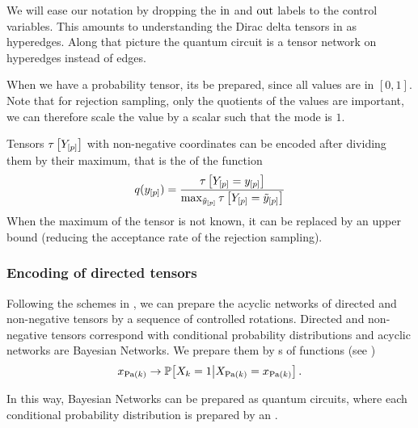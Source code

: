 We will ease our notation by dropping the $\mathrm{in}$ and $\mathrm{out}$ labels to the control variables.
This amounts to understanding the Dirac delta tensors in \activationCircuits{} as hyperedges.
Along that picture the quantum circuit is a tensor network on hyperedges instead of edges.


When we have a probability tensor, its \activationCircuit{} be prepared, since all values are in $[0,1]$.
Note that for rejection sampling, only the quotients of the values are important, we can therefore scale the value by a scalar such that the mode is $1$.

Tensors $\tau\left[Y_{[p]}\right]$ with non-negative coordinates can be encoded after dividing them by their maximum, that is the \activationCircuit{} of the function
\begin{align*}
    q(y_{[p]}) = \frac{\tau\left[Y_{[p]}=y_{[p]}\right]}{\max_{\tilde{y}_{[p]}} \tau\left[Y_{[p]}=\tilde{y}_{[p]}\right]}
\end{align*}
When the maximum of the tensor is not known, it can be replaced by an upper bound (reducing the acceptance rate of the rejection sampling).

\subsubsection{Encoding of directed tensors}

Following the schemes in \cite{low_quantum_2014}, we can prepare the acyclic networks of directed and non-negative tensors by a sequence of controlled rotations.
Directed and non-negative tensors correspond with conditional probability distributions and acyclic networks are Bayesian Networks.
We prepare them by \activationCircuit{}s of functions (see )
\begin{align*}
    x_{\mathrm{Pa}(k)} \rightarrow \mathbb{P}\big[X_{k}=1\big|X_{\mathrm{Pa}(k)}=x_{\mathrm{Pa}(k)}\big] \, .
\end{align*}

In this way, Bayesian Networks can be prepared as quantum circuits, where each conditional probability distribution is prepared by an \activationCircuit{}.


